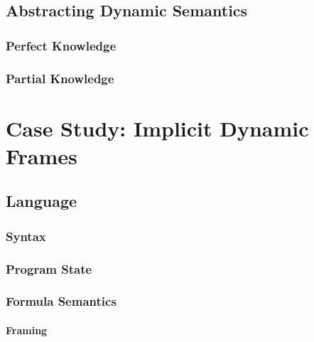 \section{Abstracting Dynamic Semantics}
\label{sec:abstracting-dynamic-semantics}

    
    \subsection{Perfect Knowledge}
    \label{ssec:perfect-knowledge}
    
    
    \subsection{Partial Knowledge}
    \label{ssec:atomic--knowledge}
    



\chapter{Case Study: Implicit Dynamic Frames}
\label{ch:case-study--implicit}


\section{Language}
\label{sec:language}


    \subsection{Syntax}
    \label{sec:syntax}
    
    
    \subsection{Program State}
    \label{ssec:program-state}
    
        
    \subsection{Formula Semantics}
    \label{ssec:formula-semantics}
    
    
        \subsubsection{Framing}
        \label{sssec:framing}
        
        

